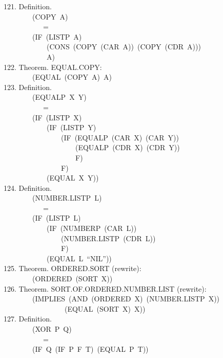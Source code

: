 \documentclass[10pt]{book}
\newenvironment{pubasis}{\begin{flushleft}}{\end{flushleft}}
\begin{document}
\begin{pubasis}
121.    Definition.\\
~~~~~~~~(COPY~A)\\
~~~~~~~~~~~=\\
~~~~~~~~(IF~(LISTP~A)\\
~~~~~~~~~~~~(CONS~(COPY~(CAR~A))~(COPY~(CDR~A)))\\
~~~~~~~~~~~~A)\\

122.    Theorem.  EQUAL.COPY:\\
~~~~~~~~(EQUAL~(COPY~A)~A)\\

123.    Definition.\\
~~~~~~~~(EQUALP~X~Y)\\
~~~~~~~~~~~=\\
~~~~~~~~(IF~(LISTP~X)\\
~~~~~~~~~~~~(IF~(LISTP~Y)\\
~~~~~~~~~~~~~~~~(IF~(EQUALP~(CAR~X)~(CAR~Y))\\
~~~~~~~~~~~~~~~~~~~~(EQUALP~(CDR~X)~(CDR~Y))\\
~~~~~~~~~~~~~~~~~~~~F)\\
~~~~~~~~~~~~~~~~F)\\
~~~~~~~~~~~~(EQUAL~X~Y))\\

124.    Definition.\\
~~~~~~~~(NUMBER.LISTP~L)\\
~~~~~~~~~~~=\\
~~~~~~~~(IF~(LISTP~L)\\
~~~~~~~~~~~~(IF~(NUMBERP~(CAR~L))\\
~~~~~~~~~~~~~~~~(NUMBER.LISTP~(CDR~L))\\
~~~~~~~~~~~~~~~~F)\\
~~~~~~~~~~~~(EQUAL~L~``NIL''))\\

125.    Theorem.  ORDERED.SORT (rewrite):\\
~~~~~~~~(ORDERED~(SORT~X))\\

126.    Theorem.  SORT.OF.ORDERED.NUMBER.LIST (rewrite):\\
~~~~~~~~(IMPLIES~(AND~(ORDERED~X)~(NUMBER.LISTP~X))\\
~~~~~~~~~~~~~~~~~(EQUAL~(SORT~X)~X))\\

127.    Definition.\\
~~~~~~~~(XOR~P~Q)\\
~~~~~~~~~~~=\\
~~~~~~~~(IF~Q~(IF~P~F~T)~(EQUAL~P~T))\\


\end{pubasis}
\end{document}
